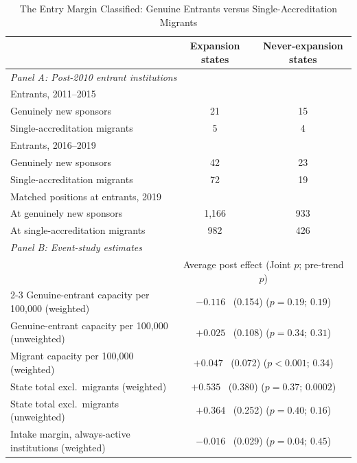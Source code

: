 \begin{table}[H]
\centering
\singlespacing
\small
\begin{threeparttable}
\caption{The Entry Margin Classified: Genuine Entrants versus Single-Accreditation Migrants}
\label{tab:entryclass}
\begin{tabular}{lcc}
\toprule
 & Expansion states & Never-expansion states \\
\midrule
\multicolumn{3}{l}{\textit{Panel A: Post-2010 entrant institutions}} \\
\midrule
Entrants, 2011--2015          &        &        \\
\quad Genuinely new sponsors  & 21     & 15     \\
\quad Single-accreditation migrants & 5 & 4     \\
Entrants, 2016--2019          &        &        \\
\quad Genuinely new sponsors  & 42     & 23     \\
\quad Single-accreditation migrants & 72 & 19   \\
Matched positions at entrants, 2019 &  &        \\
\quad At genuinely new sponsors & 1{,}166 & 933 \\
\quad At single-accreditation migrants & 982 & 426 \\
\midrule
\multicolumn{3}{l}{\textit{Panel B: Event-study estimates}} \\
\midrule
 & \multicolumn{2}{c}{Average post effect \quad (Joint $p$; pre-trend $p$)} \\
\cmidrule(lr){2-3}
Genuine-entrant capacity per 100{,}000 (weighted)   & \multicolumn{2}{c}{$-0.116$ \ (0.154) \quad ($p = 0.19$; $0.19$)} \\
Genuine-entrant capacity per 100{,}000 (unweighted) & \multicolumn{2}{c}{$+0.025$ \ (0.108) \quad ($p = 0.34$; $0.31$)} \\
Migrant capacity per 100{,}000 (weighted)           & \multicolumn{2}{c}{$+0.047$ \ (0.072) \quad ($p < 0.001$; $0.34$)} \\
State total excl.\ migrants (weighted)              & \multicolumn{2}{c}{$+0.535$ \ (0.380) \quad ($p = 0.37$; $0.0002$)} \\
State total excl.\ migrants (unweighted)            & \multicolumn{2}{c}{$+0.364$ \ (0.252) \quad ($p = 0.40$; $0.16$)} \\
Intake margin, always-active institutions (weighted)    & \multicolumn{2}{c}{$-0.016$ \ (0.029) \quad ($p = 0.04$; $0.45$)} \\

\end{tabular}
\end{threeparttable}
\end{table}
